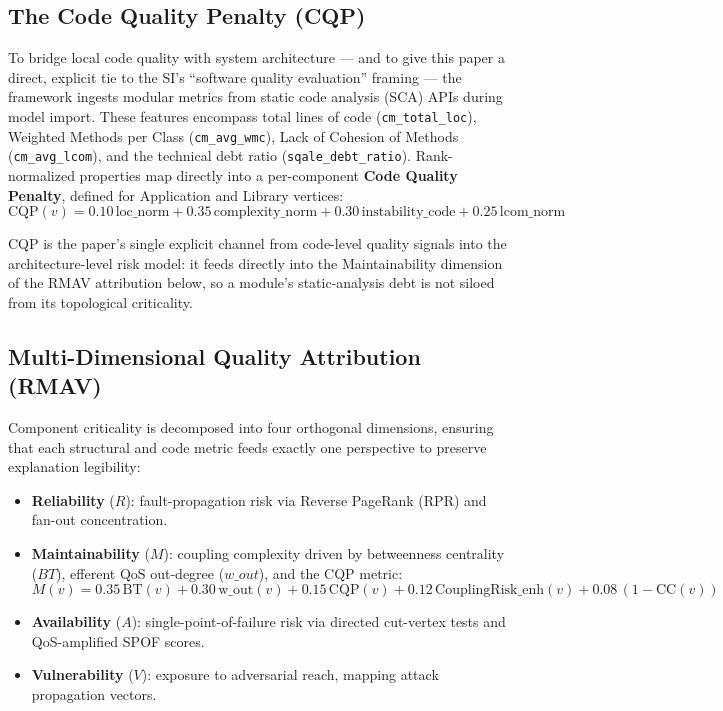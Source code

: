 \documentclass[11pt]{article}
\begin{document}
\subsection{The Code Quality Penalty (CQP)}

To bridge local code quality with system architecture --- and to give this paper a direct, explicit
tie to the SI's ``software quality evaluation'' framing --- the framework ingests modular metrics from
static code analysis (SCA) APIs during model import. These features encompass total lines of code
(\texttt{cm\_total\_loc}), Weighted Methods per Class (\texttt{cm\_avg\_wmc}), Lack of Cohesion of
Methods (\texttt{cm\_avg\_lcom}), and the technical debt ratio (\texttt{sqale\_debt\_ratio}).
Rank-normalized properties map directly into a per-component \textbf{Code Quality Penalty}, defined
for Application and Library vertices:
\begin{equation*}
\mathrm{CQP}(v) = 0.10\,\text{loc\_norm} + 0.35\,\text{complexity\_norm} + 0.30\,\text{instability\_code} + 0.25\,\text{lcom\_norm}
\end{equation*}

CQP is the paper's single explicit channel from code-level quality signals into the architecture-level
risk model: it feeds directly into the Maintainability dimension of the RMAV attribution below, so a
module's static-analysis debt is not siloed from its topological criticality.

\subsection{Multi-Dimensional Quality Attribution (RMAV)}

Component criticality is decomposed into four orthogonal dimensions, ensuring that each structural and
code metric feeds exactly one perspective to preserve explanation legibility:

\begin{itemize}
\item \textbf{Reliability} ($R$): fault-propagation risk via Reverse PageRank (RPR) and fan-out
  concentration.
\item \textbf{Maintainability} ($M$): coupling complexity driven by betweenness centrality ($BT$),
  efferent QoS out-degree ($w\_out$), and the CQP metric:
\begin{equation*}
M(v) = 0.35\,\mathrm{BT}(v) + 0.30\,\mathrm{w\_out}(v) + 0.15\,\mathrm{CQP}(v) + 0.12\,\mathrm{CouplingRisk\_enh}(v) + 0.08\,(1-\mathrm{CC}(v))
\end{equation*}
\item \textbf{Availability} ($A$): single-point-of-failure risk via directed cut-vertex tests and
  QoS-amplified SPOF scores.
\item \textbf{Vulnerability} ($V$): exposure to adversarial reach, mapping attack propagation vectors.
\end{itemize}
\end{document}
